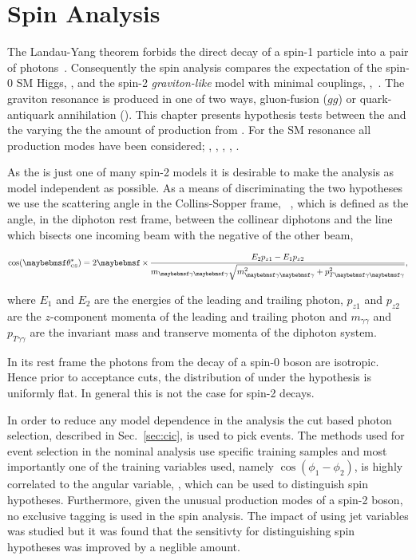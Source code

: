 \chapter{Spin Analysis}
\label{chap:spin}

The Landau-Yang theorem forbids the direct decay of a spin-1 particle into a pair of photons~\cite{Landau1948,Yang1950}. 
Consequently the spin analysis compares the expectation of the spin-0 SM Higgs, \zerop, and the spin-2 \emph{graviton-like} 
model with minimal couplings, \twomp,~\cite{Gao2010}. The \twomp graviton resonance is produced in one of two ways, gluon-fusion ($gg$) 
or quark-antiquark annihilation (\qqbar). This chapter presents hypothesis tests between the \zerop and the \twomp varying the the amount of 
\twomp production from \qqbar. For the \zerop SM 
resonance all production modes have been considered; \ggH, \VBF, \WH, \ZH, \ttH. 

As the \twomp is just one of many spin-2 models it is desirable to make the analysis as model independent as possible. As a means of 
discriminating the two hypotheses we use the scattering angle in the Collins-Sopper frame, \costhetastar ~\cite{CollinsSoper1977}, which is defined as the angle, in the diphoton rest frame, between the collinear diphotons 
and the line which bisects one incoming beam with the negative of the other beam, 

\begin{equation}
  \cos(\theta^{\ast}_{\mbox{\tiny{CS}}}) = 2\times\frac{E_{2}p_{z1}-E_{1}p_{z2}}{m_{\gamma\gamma}\sqrt{m^{2}_{\gamma\gamma}+p^{2}_{T\gamma\gamma}}},
\end{equation}

where $E_{1}$ and $E_{2}$ are the energies of the leading and trailing photon, $p_{z1}$ and $p_{z2}$ are the $z$-component momenta 
of the leading and trailing photon and $m_{\gamma\gamma}$ and $p_{T\gamma\gamma}$ are the invariant mass and transerve momenta of the diphoton system.

In its rest frame the photons from the decay of a spin-0 boson are isotropic. Hence prior to acceptance cuts, the distribution of \costhetastar 
under the \zerop hypothesis is uniformly flat. In general this is not the case for spin-2 decays. 

In order to reduce any model dependence in the analysis the cut based photon selection, described in Sec.~\ref{sec:cic}, is used to pick events. The \MVA methods used for event selection in the nominal analysis use specific \SM \MC training samples and most importantly one of the training variables used, namely $\cos(\phi_{1}-\phi_{2})$, is highly correlated to the angular variable, \costhetastar, which can be used to distinguish spin hypotheses. Furthermore, given the unusual production modes of a spin-2 boson, no exclusive tagging is used in the spin analysis. The impact of using jet variables was studied but it was found that the sensitivty for distinguishing spin hypotheses was improved by a neglible amount.

